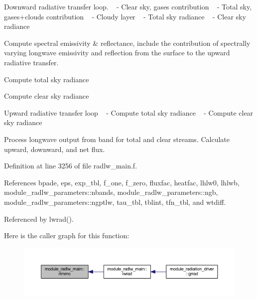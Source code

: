 \begin{DoxyEnumerate}
\item Downward radiative transfer loop. ~\newline
 -\/ Clear sky, gases contribution ~\newline
 -\/ Total sky, gases+clouds contribution ~\newline
 -\/ Cloudy layer ~\newline
 -\/ Total sky radiance ~\newline
 -\/ Clear sky radiance
\item Compute spectral emissivity \& reflectance, include the contribution of spectrally varying longwave emissivity and reflection from the surface to the upward radiative transfer.
\item Compute total sky radiance
\item Compute clear sky radiance
\item Upward radiative transfer loop ~\newline
 -\/ Compute total sky radiance ~\newline
 -\/ Compute clear sky radiance
\item Process longwave output from band for total and clear streams. Calculate upward, downward, and net flux. 
\end{DoxyEnumerate}

Definition at line 3256 of file radlw\+\_\+main.\+f.



References bpade, eps, exp\+\_\+tbl, f\+\_\+one, f\+\_\+zero, fluxfac, heatfac, lhlw0, lhlwb, module\+\_\+radlw\+\_\+parameters\+::nbands, module\+\_\+radlw\+\_\+parameters\+::ngb, module\+\_\+radlw\+\_\+parameters\+::ngptlw, tau\+\_\+tbl, tblint, tfn\+\_\+tbl, and wtdiff.



Referenced by lwrad().



Here is the caller graph for this function\+:
\nopagebreak
\begin{figure}[H]
\begin{center}
\leavevmode
\includegraphics[width=350pt]{namespacemodule__radlw__main_a51d42f46321972ffdca4880185506ac5_icgraph}
\end{center}
\end{figure}


